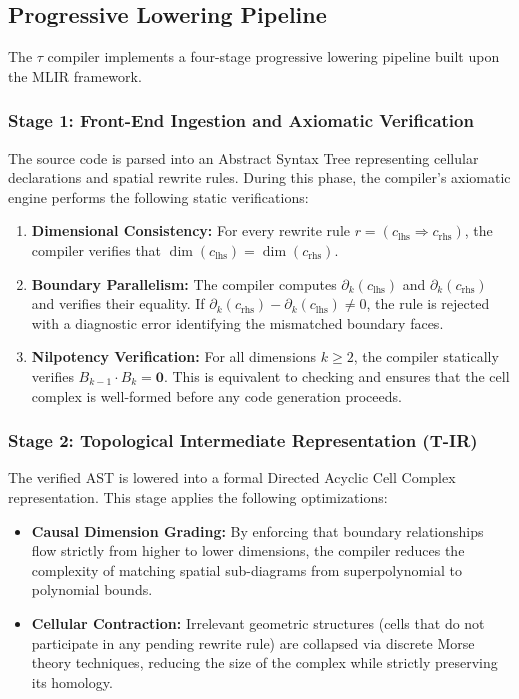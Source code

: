 \documentclass[manuscript, nonacm, review=false]{acmart}
\theoremstyle{definition}
\theoremstyle{plain}
\newcommand{\toposLang}{\ensuremath{\tau}\text{-Lang}}
\begin{document}
\subsection{Progressive Lowering Pipeline}
\label{subsec:pipeline}

The \toposLang{} compiler implements a four-stage progressive lowering pipeline built upon the MLIR framework.

\subsubsection{Stage 1: Front-End Ingestion and Axiomatic Verification}

The source code is parsed into an Abstract Syntax Tree representing cellular declarations and spatial rewrite rules. During this phase, the compiler's axiomatic engine performs the following static verifications:

\begin{enumerate}[label=(\alph*)]
    \item \textbf{Dimensional Consistency:} For every rewrite rule $r = (c_{\text{lhs}} \Rightarrow c_{\text{rhs}})$, the compiler verifies that $\dim(c_{\text{lhs}}) = \dim(c_{\text{rhs}})$.
    
    \item \textbf{Boundary Parallelism:} The compiler computes $\partial_k(c_{\text{lhs}})$ and $\partial_k(c_{\text{rhs}})$ and verifies their equality. If $\partial_k(c_{\text{rhs}}) - \partial_k(c_{\text{lhs}}) \neq 0$, the rule is rejected with a diagnostic error identifying the mismatched boundary faces.
    
    \item \textbf{Nilpotency Verification:} For all dimensions $k \geq 2$, the compiler statically verifies $B_{k-1} \cdot B_k = \mathbf{0}$. This is equivalent to checking  and ensures that the cell complex is well-formed before any code generation proceeds.
\end{enumerate}

\subsubsection{Stage 2: Topological Intermediate Representation (T-IR)}

The verified AST is lowered into a formal Directed Acyclic Cell Complex representation. This stage applies the following optimizations:

\begin{itemize}
    \item \textbf{Causal Dimension Grading:} By enforcing that boundary relationships flow strictly from higher to lower dimensions, the compiler reduces the complexity of matching spatial sub-diagrams from superpolynomial to polynomial bounds.
    
    \item \textbf{Cellular Contraction:} Irrelevant geometric structures (cells that do not participate in any pending rewrite rule) are collapsed via discrete Morse theory techniques, reducing the size of the complex while strictly preserving its homology.
\end{itemize}
\end{document}

